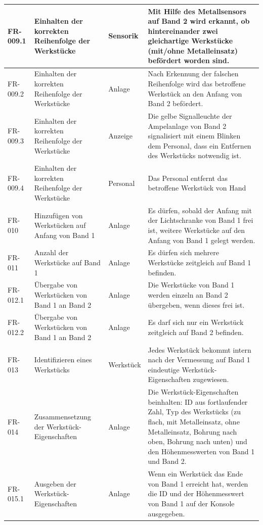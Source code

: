 \documentclass[oneside,a4paper,titlepage]{scrartcl} %
\begin{document}
\begin{small}
\begin{longtable}{|C{2cm}|L{4cm}|C{1.5cm}|L{5.5cm}|}
  \hline
  FR-009.1 & Einhalten der korrekten Reihenfolge der Werkstücke & Sensorik & Mit Hilfe des Metallsensors auf Band 2 wird erkannt, ob hintereinander zwei gleichartige Werkstücke (mit/ohne Metalleinsatz) befördert worden sind.\\
  \hline
  FR-009.2 & Einhalten der korrekten Reihenfolge der Werkstücke & Anlage & Nach Erkennung der falschen Reihenfolge wird das betroffene Werkstück an den Anfang von Band 2 befördert.\\
  \hline
  FR-009.3 & Einhalten der korrekten Reihenfolge der Werkstücke & Anzeige & Die gelbe Signalleuchte der Ampelanlage von Band 2 signalisiert mit einem Blinken dem Personal, dass ein Entfernen des Werkstücks notwendig ist.\\
  \hline
  FR-009.4 & Einhalten der korrekten Reihenfolge der Werkstücke & Personal & Das Personal entfernt das betroffene Werkstück von Hand\\
  \hline
   FR-010 & Hinzufügen von Werkstücken auf Anfang von Band 1 & Anlage & Es dürfen, sobald der Anfang mit der Lichtschranke von Band 1 frei ist, weitere Werkstücke auf den Anfang von Band 1 gelegt werden.\\
  \hline
  FR-011 & Anzahl der Werkstücke auf Band 1 & Anlage & Es dürfen sich mehrere Werkstücke zeitgleich auf Band 1 befinden.\\
  \hline
   FR-012.1 & Übergabe von Werkstücken von Band 1 an Band 2 & Anlage & Die Werkstücke von Band 1 werden einzeln an Band 2 übergeben, wenn dieses frei ist.\\
  \hline
   FR-012.2 & Übergabe von Werkstücken von Band 1 an Band 2 & Anlage & Es darf sich nur ein Werkstück zeitgleich auf Band 2 befinden.\\
  \hline
  FR-013 & Identifizieren eines Werkstücks & Werkstück & Jedes Werkstück bekommt intern nach der Vermessung auf Band 1 eindeutige Werkstück-Eigenschaften zugewiesen.\\
  \hline
   FR-014 & Zusammensetzung der Werkstück-Eigenschaften & Anlage & Die Werkstück-Eigenschaften beinhalten: ID aus fortlaufender Zahl, Typ des Werkstücks (zu flach, mit Metalleinsatz, ohne Metalleinsatz, Bohrung nach oben, Bohrung nach unten) und den Höhenmesswerten von Band 1 und Band 2.\\
  \hline
  FR-015.1 & Ausgeben der Werkstück-Eigenschaften & Anlage & Wenn ein Werkstück das Ende von Band 1 erreicht hat, werden die ID und der Höhenmesswert von Band 1 auf der Konsole ausgegeben.\\

\end{longtable}
\end{small}
\end{document}
